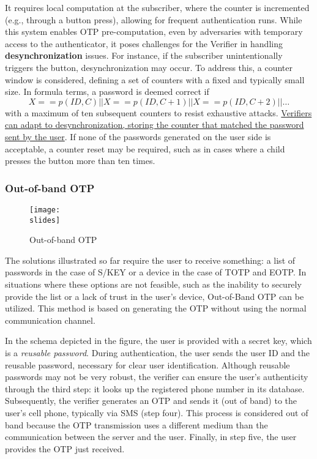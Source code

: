 It requires local computation at the subscriber, where the counter is incremented (e.g., through a button press), allowing for frequent authentication runs. 
While this system enables OTP pre-computation, even by adversaries with temporary access to the authenticator, it poses challenges for the Verifier in handling \textbf{desynchronization} issues. For instance, if the subscriber unintentionally triggers the button, desynchronization may occur. 
To address this, a counter window is considered, defining a set of counters with a fixed and typically small size. In formula terms, a password is deemed correct if 
\[
X == p(ID, C) || X == p(ID, C + 1) || X == p(ID, C + 2) || \ldots 
\] 
with a maximum of ten subsequent counters to resist exhaustive attacks. 
\ul{Verifiers can adapt to desynchronization, storing the counter that matched the password sent by the user}. 
If none of the passwords generated on the user side is acceptable, a counter reset may be required, such as in cases where a child presses the button more than ten times.


\subsubsection{Out-of-band OTP}
\begin{figure}[h]
  \centering
  \texttt{[image: \\slides]}
  \caption{Out-of-band OTP}
\end{figure}

The solutions illustrated so far require the user to receive something: a list of passwords in the case of S/KEY or a device in the case of TOTP and EOTP. In situations where these options are not feasible, such as the inability to securely provide the list or a lack of trust in the user's device, Out-of-Band OTP can be utilized. This method is based on generating the OTP without using the normal communication channel.

In the schema depicted in the figure, the user is provided with a secret key, which is a \textit{reusable password}. During authentication, the user sends the user ID and the reusable password, necessary for clear user identification. Although reusable passwords may not be very robust, the verifier can ensure the user's authenticity through the third step: it looks up the registered phone number in its database. Subsequently, the verifier generates an OTP and sends it (out of band) to the user's cell phone, typically via SMS (step four). This process is considered out of band because the OTP transmission uses a different medium than the communication between the server and the user. Finally, in step five, the user provides the OTP just received.

